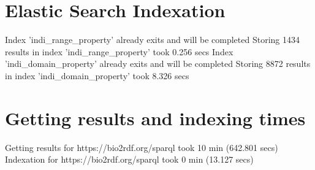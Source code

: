\documentclass[a4paper,12pt]{article}
\begin{document}
\section{Elastic Search Indexation}
Index 'indi\_range\_property' already exits and will be completed\newline
Storing 1434 results in index 'indi\_range\_property' took 0.256 secs 
\newline
\newline
Index 'indi\_domain\_property' already exits and will be completed\newline
Storing 8872 results in index 'indi\_domain\_property' took 8.326 secs 
\newline
\newline
\section{Getting results and indexing times}
Getting results for https://bio2rdf.org/sparql took 10 min (642.801 secs)\newline
Indexation for https://bio2rdf.org/sparql took 0 min (13.127 secs)
\end{document}

